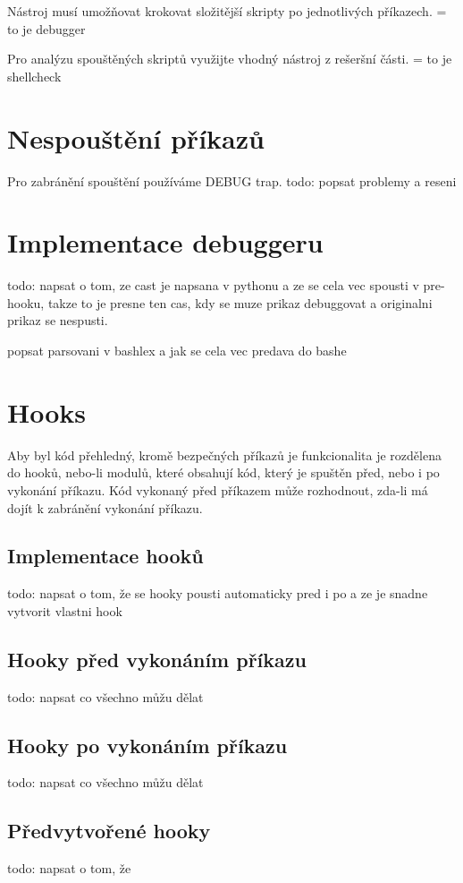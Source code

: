 \documentclass[thesis=M,czech]{FITthesis}[2012/06/26]
\begin{document}
Nástroj musí umožňovat krokovat složitější skripty po jednotlivých příkazech. = to je debugger

Pro analýzu spouštěných skriptů využijte vhodný nástroj z rešeršní části. = to je shellcheck




%
%
%
%
%
\section{Nespouštění příkazů}
Pro zabránění spouštění používáme DEBUG trap.
todo: popsat problemy a reseni


%
%
%
%
%
\section{Implementace debuggeru}
todo: napsat o tom, ze cast je napsana v pythonu a ze se cela vec spousti v pre-hooku, takze to je presne ten cas, kdy se muze prikaz debuggovat a originalni prikaz se nespusti.

popsat parsovani v bashlex a jak se cela vec predava do bashe

%
%
%
%
%
\section{Hooks}
Aby byl kód přehledný, kromě bezpečných příkazů je funkcionalita je rozdělena do hooků, nebo-li modulů, které obsahují kód, který je spuštěn před, nebo i po vykonání příkazu. Kód vykonaný před příkazem může rozhodnout, zda-li má dojít k zabránění vykonání příkazu.


\subsection{Implementace hooků}
todo: napsat o tom, že se hooky pousti automaticky pred i po a ze je snadne vytvorit vlastni hook

\subsection{Hooky před vykonáním příkazu}
todo: napsat co všechno můžu dělat

\subsection{Hooky po vykonáním příkazu}
todo: napsat co všechno můžu dělat

\subsection{Předvytvořené hooky}
todo: napsat o tom, že 
\end{document}
